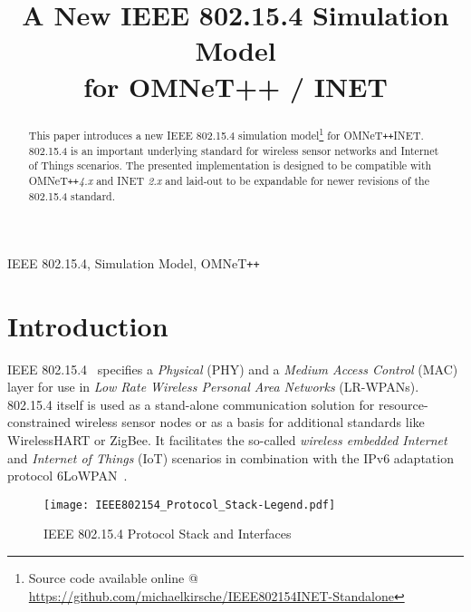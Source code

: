\documentclass[conference,10pt]{IEEEtran}
\newcommand{\omnet}{{OMNeT\texttt{++}}\xspace}
\newcommand{\omnetinet}{{OMNeT\texttt{++}INET}\xspace}
\begin{document}
\title{A New IEEE 802.15.4 Simulation Model \\ for OMNeT++ / INET}

\author{
}

\IEEEspecialpapernotice{\vspace{-1.5\baselineskip}}

\maketitle

\begin{abstract}
This paper introduces a new IEEE 802.15.4 simulation model\footnote{Source code available online @ \url{https://github.com/michaelkirsche/IEEE802154INET-Standalone}} for \omnetinet.
802.15.4 is an important underlying standard for wireless sensor networks and Internet of Things scenarios.
The presented implementation is designed to be compatible with \omnet \emph{4.x} and INET \emph{2.x} and laid-out to be expandable for newer revisions of the 802.15.4 standard.
\end{abstract}

\begin{keywords}
IEEE 802.15.4, Simulation Model, \omnet
\end{keywords}

\section{Introduction}
\label{sec:introduction}
IEEE 802.15.4~\cite{IEEE802154} specifies a \emph{Physical} (PHY) and a \emph{Medium Access Control} (MAC) layer for use in \emph{Low Rate Wireless Personal Area Networks} (LR-WPANs).
802.15.4 itself is used as a stand-alone communication solution for resource-constrained wireless sensor nodes or as a basis for additional standards like WirelessHART or ZigBee.
It facilitates the so-called \emph{wireless embedded Internet} and \emph{Internet of Things} (IoT) scenarios in combination with the IPv6 adaptation protocol 6LoWPAN~\cite{RFC6282}.

\begin{figure}[htb]
	\centering
	\texttt{[image: IEEE802154\_Protocol\_Stack-Legend.pdf]}
	\caption{IEEE 802.15.4 Protocol Stack and Interfaces}
	\label{fig:IEEE802154_Stack}
\end{figure}
\end{document}
